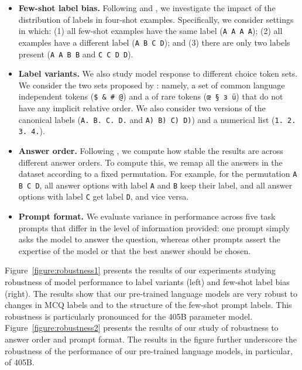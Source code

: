 \begin{itemize}

\item \textbf{Few-shot label bias.}
Following \citet{zheng2023large} and \citet{weber-etal-2023-mind}, we investigate the impact of the distribution of labels in four-shot examples.
Specifically, we consider settings in which: (1) all few-shot examples have the same label (\texttt{A A A A}); (2) all examples have a different label (\texttt{A B C D}); and (3) there are only two labels present (\texttt{A A B B} and \texttt{C C D D}).

\item \textbf{Label variants.} 
We also study model response to different choice token sets.
We consider the two sets proposed by \citet{alzahrani2024when}: namely, a set of common language independent tokens (\texttt{\$ \& \# @}) and a of rare tokens (\texttt{œ § \foreignlanguage{russian}{з} ü}) that do not have any implicit relative order.
We also consider two versions of the canonical labels (\texttt{A. B. C. D.} and \texttt{A) B) C) D)}) and a numerical list (\texttt{1. 2. 3. 4.}).

\item \textbf{Answer order.}
Following \citet{wang2024beyond}, we compute how stable the results are across different answer orders.
To compute this, we remap all the answers in the dataset according to a fixed permutation.
For example, for the permutation \texttt{A B C D}, all answer options with label \texttt{A} and \texttt{B} keep their label, and all answer options with label \texttt{C} get label \texttt{D}, and vice versa.

\item \textbf{Prompt format.}
We evaluate variance in performance across five task prompts that differ in the level of information provided: one prompt simply asks the model to answer the question, whereas other prompts assert the expertise of the model or that the best answer should be chosen.

\end{itemize}

Figure~\ref{figure:robustness1} presents the results of our experiments studying robustness of model performance to label variants (left) and few-shot label bias (right). 
The results show that our pre-trained language models are very robust to changes in MCQ labels and to the structure of the few-shot prompt labels.
This robustness is particularly pronounced for the 405B parameter model.
Figure~\ref{figure:robustness2} presents the results of our study of robustness to answer order and prompt format.
The results in the figure further underscore the robustness of the performance of our pre-trained language models, in particular, of \llamathree 405B.

